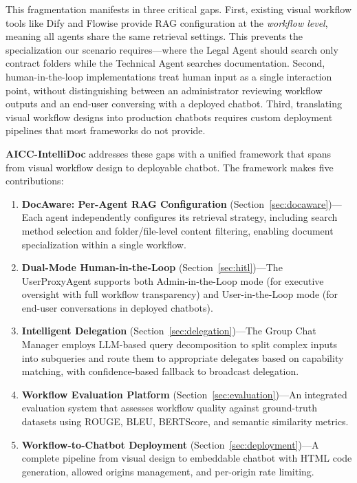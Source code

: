 \documentclass[11pt]{article}
\begin{document}
This fragmentation manifests in three critical gaps. First, existing visual workflow tools like Dify and Flowise provide RAG configuration at the \textit{workflow level}, meaning all agents share the same retrieval settings. This prevents the specialization our scenario requires—where the Legal Agent should search only contract folders while the Technical Agent searches documentation. Second, human-in-the-loop implementations treat human input as a single interaction point, without distinguishing between an administrator reviewing workflow outputs and an end-user conversing with a deployed chatbot. Third, translating visual workflow designs into production chatbots requires custom deployment pipelines that most frameworks do not provide.

\textbf{AICC-IntelliDoc} addresses these gaps with a unified framework that spans from visual workflow design to deployable chatbot. The framework makes five contributions:

\begin{enumerate}
    \item \textbf{DocAware: Per-Agent RAG Configuration} (Section~\ref{sec:docaware})—Each agent independently configures its retrieval strategy, including search method selection and folder/file-level content filtering, enabling document specialization within a single workflow.
    
    \item \textbf{Dual-Mode Human-in-the-Loop} (Section~\ref{sec:hitl})—The UserProxyAgent supports both Admin-in-the-Loop mode (for executive oversight with full workflow transparency) and User-in-the-Loop mode (for end-user conversations in deployed chatbots).
    
    \item \textbf{Intelligent Delegation} (Section~\ref{sec:delegation})—The Group Chat Manager employs LLM-based query decomposition to split complex inputs into subqueries and route them to appropriate delegates based on capability matching, with confidence-based fallback to broadcast delegation.
    
    \item \textbf{Workflow Evaluation Platform} (Section~\ref{sec:evaluation})—An integrated evaluation system that assesses workflow quality against ground-truth datasets using ROUGE, BLEU, BERTScore, and semantic similarity metrics.
    
    \item \textbf{Workflow-to-Chatbot Deployment} (Section~\ref{sec:deployment})—A complete pipeline from visual design to embeddable chatbot with HTML code generation, allowed origins management, and per-origin rate limiting.
\end{enumerate}
\end{document}
